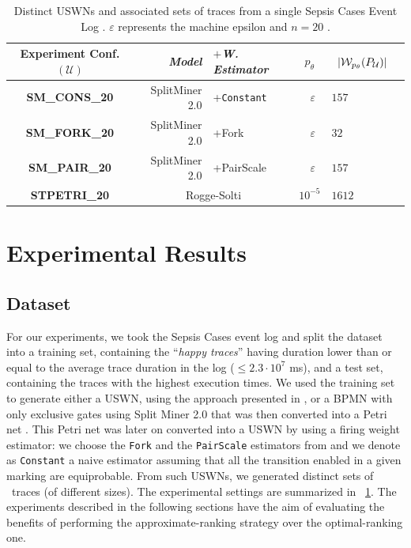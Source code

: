 \begin{table}[!t]
\caption{Distinct USWNs and associated sets of \unravelled traces from a single Sepsis Cases Event Log \cite{mannhardt_2016}. $\varepsilon$ represents the machine epsilon \ifdefined\WWITHN and $n=20$ \fi.}\label{tab:dataset}
\centering
 \begin{adjustbox}{max width=\textwidth}
	\begin{tabular}{crl||cl|c}
		\toprule
		\textbf{Experiment Conf.} $(\mathcal{U})$ & \textit{Model} & $+$\textit{W. Estimator} & $p_\theta$& $\;\;|\WCal{p_\theta}{n}(P_{\mathcal{U}})|$ \\
		\midrule
		
		\textbf{SM\_CONS\_20} &SplitMiner 2.0  \cite{AugustoCDRP19}       & +\texttt{Constant} &  $\;\;\varepsilon$ & $157$  \\
		
		\textbf{SM\_FORK\_20} & SplitMiner 2.0  \cite{AugustoCDRP19}      & +Fork \cite{spdwe} &  $\;\;\varepsilon$ & $32$  \\
		
		
		\textbf{SM\_PAIR\_20} & SplitMiner 2.0  \cite{AugustoCDRP19}      & +PairScale \cite{spdwe} &  $\;\;\varepsilon$ & $157$ \\

		\textbf{STPETRI\_20} & \multicolumn{2}{c||}{Rogge-Solti \cite{RoggeSoltiAW13}} &  $10^{-5}$ & $1612$ \\
		\bottomrule
	\end{tabular}
\end{adjustbox}
\end{table}
\section{Experimental Results}\label{sec:exp}
\subsection{Dataset}
For our experiments, we took the Sepsis Cases event log \cite{mannhardt_2016} and split the dataset into a training set, containing the ``\textit{happy traces}''  having duration lower than or equal to the average trace duration in the log ($\leq 2.3\cdot 10^{7}$ ms), and a test set, containing the traces with the highest execution times. We used the training set to generate either a USWN, using the approach presented in \cite{RoggeSoltiAW13}, or a BPMN with only exclusive gates using Split Miner 2.0 \cite{AugustoCDRP19} that was then converted into a Petri net \cite{PPNFromLog}. This Petri net was later on converted into a USWN by using a firing weight estimator: we choose the \texttt{Fork} and the \texttt{PairScale} estimators from \cite{spdwe} and we denote as \texttt{Constant} a naive estimator assuming that all the transition enabled in a given marking are equiprobable. %
From such USWNs, we generated distinct sets of \unravelled\ traces (of different sizes). The experimental settings are summarized in \tablename~\ref{tab:dataset}. The experiments described in the following sections have the aim of evaluating the benefits of performing the approximate-ranking strategy over the optimal-ranking one.

